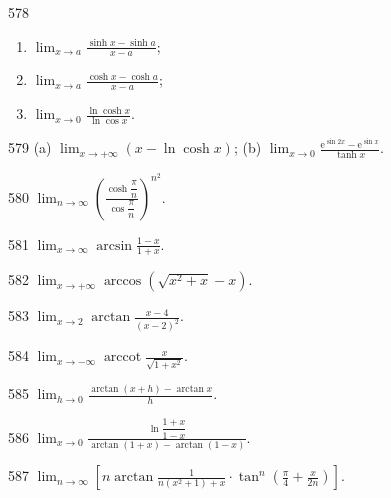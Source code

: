 \begin{prob}[L]{578}
\begin{enumerate}[label=(\alph*), itemsep=2pt, topsep=3pt]
  \item $\displaystyle \lim_{x\to a} \frac{\sinh x - \sinh a}{x-a}$;
  \item $\displaystyle \lim_{x\to a} \frac{\cosh x - \cosh a}{x-a}$;
  \item $\displaystyle \lim_{x\to 0} \frac{\ln\cosh x}{\ln\cos x}.$
\end{enumerate}
\end{prob}

\begin{prob}[M]{579}
(a) $\displaystyle \lim_{x\to +\infty} (x - \ln\cosh x)$; \qquad (b) $\displaystyle \lim_{x\to 0} \frac{\mathrm{e}^{\sin 2x} - \mathrm{e}^{\sin x}}{\tanh x}.$
\end{prob}

\begin{prob}[S]{580}
$\displaystyle \lim_{n\to \infty} \left(\frac{\cosh\dfrac{\pi}{n}}{\cos\dfrac{\pi}{n}}\right)^{n^2}.$
\end{prob}

\begin{prob}[S]{581}
$\displaystyle \lim_{x\to \infty} \arcsin\frac{1-x}{1+x}.$
\end{prob}

\begin{prob}[S]{582}
$\displaystyle \lim_{x\to +\infty} \arccos(\sqrt{x^2+x} - x).$
\end{prob}

\begin{prob}[S]{583}
$\displaystyle \lim_{x\to 2} \arctan\frac{x-4}{(x-2)^2}.$
\end{prob}

\begin{prob}[S]{584}
$\displaystyle \lim_{x\to -\infty} \operatorname{arccot}\frac{x}{\sqrt{1+x^2}}.$
\end{prob}

\begin{prob}[S]{585}
$\displaystyle \lim_{h\to 0} \frac{\arctan(x+h) - \arctan x}{h}.$
\end{prob}

\begin{prob}[S]{586}
$\displaystyle \lim_{x\to 0} \frac{\ln\dfrac{1+x}{1-x}}{\arctan(1+x) - \arctan(1-x)}.$
\end{prob}

\begin{prob}[S]{587}
$\displaystyle \lim_{n\to \infty} \left[n\arctan\frac{1}{n(x^2+1)+x}\cdot \tan^n \left(\frac{\pi}{4}+\frac{x}{2n}\right)\right].$
\end{prob}


